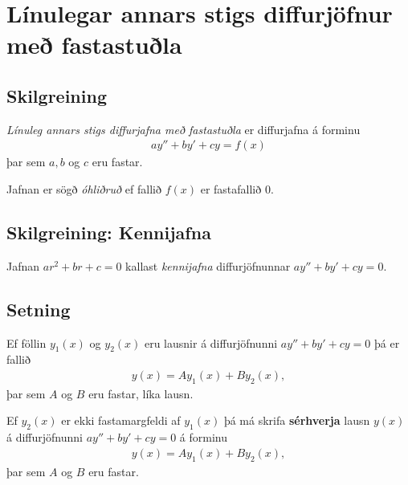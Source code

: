 \documentclass[b5paper,11pt,icelandic]{sphinxmanual}
\begin{document}
\section{Línulegar annars stigs diffurjöfnur með fastastuðla}
\label{kafli08:linulegar-annars-stigs-diffurjofnur-me-fastastula}

\subsection{Skilgreining}
\label{kafli08:skilgreining}
\emph{Línuleg annars stigs diffurjafna með fastastuðla} er diffurjafna á
forminu
\begin{equation*}
\begin{split}ay''+by'+cy=f(x)\end{split}
\end{equation*}
þar sem \(a, b\) og \(c\) eru fastar.

Jafnan er sögð \emph{óhliðruð} ef fallið \(f(x)\) er
fastafallið 0.


\subsection{Skilgreining: Kennijafna}
\label{kafli08:skilgreining-kennijafna}\label{kafli08:index-6}
Jafnan \(ar^2+br+c=0\) kallast \textit{kennijafna}
diffurjöfnunnar \(ay''+by'+cy=0\).


\subsection{Setning}
\label{kafli08:setning}
Ef föllin \(y_1(x)\) og \(y_2(x)\) eru lausnir á diffurjöfnunni
\(ay''+by'+cy=0\) þá er fallið
\begin{equation*}
\begin{split}y(x)=Ay_1(x)+By_2(x),\end{split}
\end{equation*}
þar sem \(A\) og \(B\) eru fastar, líka lausn.

Ef \(y_2(x)\) er ekki fastamargfeldi af \(y_1(x)\) þá má skrifa
\textbf{sérhverja} lausn \(y(x)\) á diffurjöfnunni \(ay''+by'+cy=0\)
á forminu
\begin{equation*}
\begin{split}y(x)=Ay_1(x)+By_2(x),\end{split}
\end{equation*}
þar sem \(A\) og \(B\) eru fastar.
\end{document}
